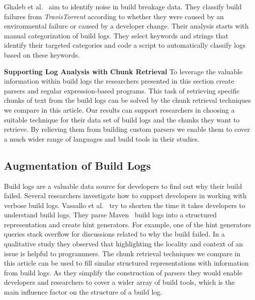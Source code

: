 Ghaleb et al.~\cite{ghaleb2019studying} aim to identify noise in build breakage data.
They classify build failures from \emph{TravisTorrent} according to whether they were caused by an environmental failure or caused by a developer change.
Their analysis starts with manual categorization of build logs.
They select keywords and strings that identify their targeted categories and code a script to automatically classify logs based on these keywords.

\noindent
\textbf{Supporting Log Analysis with Chunk Retrieval}
To leverage the valuable information within build logs the researchers presented
in this section create parsers and regular expression-based programs.
This task of retrieving specific chunks of text from the build logs can be
solved by the chunk retrieval techniques we compare in this article.
Our results can support researchers in choosing a suitable technique for their
data set of build logs and the chunks they want to retrieve.
By relieving them from building custom parsers we enable them to cover a much
wider range of languages and build tools in their studies.


\subsection{Augmentation of Build Logs}
\label{sec:rw-bl-analysis}
Build logs are a valuable data source for developers to find out why their build failed.
Several researchers investigate how to support developers in working with verbose build logs.
Vassallo et al.~\cite{vassallo2018un-break} try to shorten the time it takes developers to understand build logs.
They parse Maven~\cite{maven2019website} build logs into a structured representation and create hint generators.
For example, one of the hint generators queries stack overflow for discussions related to why the build failed.
In a qualitative study they observed that highlighting the locality and context of an issue is helpful to programmers.
The chunk retrieval techniques we compare in this article can be used to fill similar structured representations with information from build logs.
As they simplify the construction of parsers they would enable developers and researchers to cover a wider array of build tools, which is the main influence factor on the structure of a build log.

